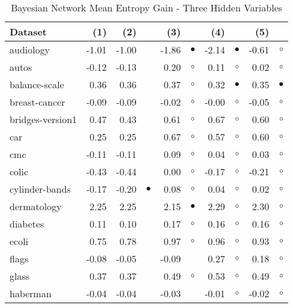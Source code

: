 \begin{table}[thb]
\caption{\label{bnmeg3}Bayesian Network Mean Entropy Gain - Three Hidden Variables}
\footnotesize
{\centering \begin{tabular}{lrr@{\hspace{0.1cm}}cr@{\hspace{0.1cm}}cr@{\hspace{0.1cm}}cr@{\hspace{0.1cm}}c}
\\
\hline
Dataset & (1)& (2) & & (3) & & (4) & & (5) & \\
\hline
audiology & -1.01 & -1.00 &           & -1.86 & $\bullet$ & -2.14 & $\bullet$ & -0.61 &   $\circ$\\
autos & -0.12 & -0.13 &           &  0.20 &   $\circ$ &  0.11 &   $\circ$ &  0.02 &   $\circ$\\
balance-scale &  0.36 &  0.36 &           &  0.37 &   $\circ$ &  0.32 & $\bullet$ &  0.35 & $\bullet$\\
breast-cancer & -0.09 & -0.09 &           & -0.02 &   $\circ$ & -0.00 &   $\circ$ & -0.05 &   $\circ$\\
bridges-version1 &  0.47 &  0.43 &           &  0.61 &   $\circ$ &  0.67 &   $\circ$ &  0.60 &   $\circ$\\
car &  0.25 &  0.25 &           &  0.67 &   $\circ$ &  0.57 &   $\circ$ &  0.60 &   $\circ$\\
cmc & -0.11 & -0.11 &           &  0.09 &   $\circ$ &  0.04 &   $\circ$ &  0.03 &   $\circ$\\
colic & -0.43 & -0.44 &           &  0.00 &   $\circ$ & -0.17 &   $\circ$ & -0.21 &   $\circ$\\
cylinder-bands & -0.17 & -0.20 & $\bullet$ &  0.08 &   $\circ$ &  0.04 &   $\circ$ &  0.02 &   $\circ$\\
dermatology &  2.25 &  2.25 &           &  2.15 & $\bullet$ &  2.29 &   $\circ$ &  2.30 &   $\circ$\\
diabetes &  0.11 &  0.10 &           &  0.17 &   $\circ$ &  0.16 &   $\circ$ &  0.16 &   $\circ$\\
ecoli &  0.75 &  0.78 &           &  0.97 &   $\circ$ &  0.96 &   $\circ$ &  0.93 &   $\circ$\\
flags & -0.08 & -0.05 &           & -0.09 &           &  0.27 &   $\circ$ &  0.18 &   $\circ$\\
glass &  0.37 &  0.37 &           &  0.49 &   $\circ$ &  0.53 &   $\circ$ &  0.49 &   $\circ$\\
haberman & -0.04 & -0.04 &           & -0.03 &           & -0.01 &   $\circ$ & -0.02 &   $\circ$\\

\end{tabular}}
\end{table}
